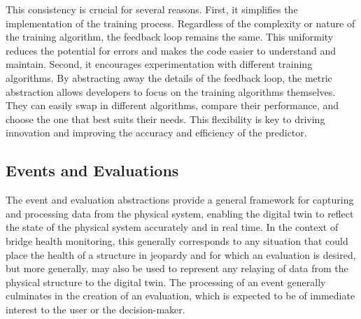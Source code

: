 This consistency is crucial for several reasons. First, it simplifies the implementation of the training process. 
Regardless of the complexity or nature of the training algorithm, the feedback loop remains the same. 
This uniformity reduces the potential for errors and makes the code easier to understand and maintain.
%
Second, it encourages experimentation with different training algorithms. By abstracting away the details of the feedback loop, the \gls{metric} abstraction allows developers to focus on the training algorithms themselves. They can easily swap in different algorithms, compare their performance, and choose the one that best suits their needs. This flexibility is key to driving innovation and improving the accuracy and efficiency of the \gls{predictor}.


\subsection{Events and Evaluations}\label{sec:events}

The \gls{event} and \gls{evaluation} abstractions provide a general framework for capturing and processing data from the physical system, enabling the digital twin to reflect the state of the physical system accurately and in real time.
In the context of bridge health monitoring, this generally corresponds to any situation that could place the health of a structure in jeopardy
and for which an \gls{evaluation} is desired, but more generally, may also be used to represent any relaying of data from the physical structure to the digital twin. 
The processing of an \gls{event} generally culminates in the creation of an \gls{evaluation}, which is expected to be of immediate interest to the user or the decision-maker.

